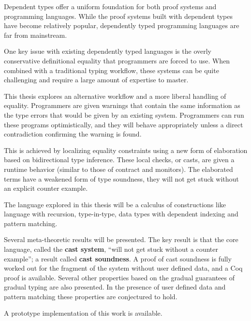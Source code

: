 Dependent types offer a uniform foundation for both proof systems and programming languages.
While the proof systems built with dependent types have become relatively popular, dependently typed programming languages are far from mainstream.

One key issue with existing dependently typed languages is the overly conservative definitional equality that programmers are forced to use.
When combined with a traditional typing workflow, these systems can be quite challenging and require a large amount of expertise to master.

This thesis explores an alternative workflow and a more liberal handling of equality.
Programmers are given warnings that contain the same information as the type errors that would be given by an existing system.
Programmers can run these programs optimistically, and they will behave appropriately unless a direct contradiction confirming the warning is found.

This is achieved by localizing equality constraints using a new form of elaboration based on bidirectional type inference.
These local checks, or casts, are given a runtime behavior (similar to those of contract and monitors).
The elaborated terms have a weakened form of type soundness, they will not get stuck without an explicit counter example.

The language explored in this thesis will be a calculus of constructions like language with recursion, type-in-type, data types with dependent indexing and pattern matching.

Several meta-theoretic results will be presented.
The key result is that the core language, called the \textbf{cast system}, ``will not get stuck without a counter example''; a result called \textbf{cast soundness}.
A proof of cast soundness is fully worked out for the fragment of the system without user defined data, and a Coq proof is available. Several other properties based on the gradual guarantees of gradual typing are also presented.
In the presence of user defined data and pattern matching these properties are conjectured to hold.

A prototype implementation of this work is available.

